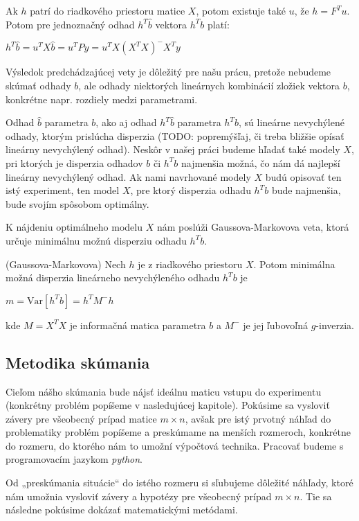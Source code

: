Ak $h$ patrí do riadkového priestoru matice $X$, potom existuje také $u$, že $h = F^T u$.
Potom pre jednoznačný odhad $h^T \hat{b}$ vektora $h^T b$ platí:

\begin{center}
$h^T \hat{b} = u^T X \hat{b} = u^T P y = u^T X(X^T X)^- X^T y$
\end{center}

Výsledok predchádzajúcej vety je dôležitý pre našu prácu, pretože nebudeme skúmať odhady $b$,
ale odhady niektorých lineárnych kombinácií zložiek vektora $b$, 
konkrétne napr. rozdiely medzi parametrami.

Odhad $\hat{b}$ parametra $b$, ako aj odhad $h^T \hat{b}$ parametra $h^T b$, sú lineárne nevychýlené odhady,
ktorým prislúcha disperzia (TODO: popremýšľaj, či treba bližšie opísať lineárny nevychýlený odhad). 
Neskôr v našej práci budeme hľadať také modely $X$, pri ktorých je disperzia odhadov $b$ či $h^T b$ najmenšia možná,
čo nám dá najlepší lineárny nevychýlený odhad. 
Ak nami navrhované modely $X$ budú opisovať ten istý experiment, ten model $X$,
pre ktorý disperzia odhadu $h^T b$ bude najmenšia, bude svojím spôsobom optimálny.

K nájdeniu optimálneho modelu $X$ nám poslúži Gaussova-Markovova veta, 
ktorá určuje minimálnu možnú disperziu odhadu $h^T b$.

\begin{theorem}
\label{gauss-markov}
(Gaussova-Markovova) Nech $h$ je z riadkového priestoru $X$. 
Potom minimálna možná disperzia lineárneho nevychýleného odhadu $h^T b$ je

\begin{center}
$
m = \mathrm{Var}[h^T b] = h^T M^- h
$
\end{center}

kde $M = X^T X$ je informačná matica parametra $b$ a $M^-$ je jej ľubovoľná $g$-inverzia.
\end{theorem}

\subsection{Metodika skúmania}

Cieľom nášho skúmania bude nájsť ideálnu maticu vstupu do experimentu (konkrétny problém popíšeme v nasledujúcej kapitole). 
Pokúsime sa vysloviť závery pre všeobecný prípad matice $m \times n$,
avšak pre istý prvotný náhľad do problematiky problém popíšeme a preskúmame na menších rozmeroch, 
konkrétne do rozmeru, do ktorého nám to umožní výpočtová technika. Pracovať budeme s programovacím jazykom \textit{python}.

Od „preskúmania situácie“ do istého rozmeru si sľubujeme dôležité náhľady, 
ktoré nám umožnia vysloviť závery a hypotézy pre všeobecný prípad $m \times n$. 
Tie sa následne pokúsime dokázať matematickými metódami.
